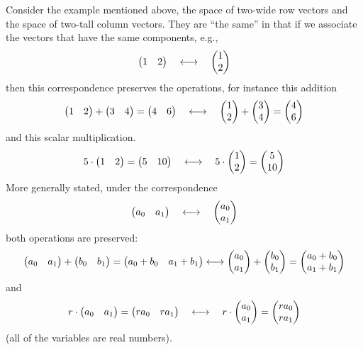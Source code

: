 \begin{example}  \label{exam:TwoWideIsoTwoTall}
Consider the example mentioned above, the 
space of two-wide row vectors and
the space of two-tall column vectors.
They are ``the same'' in that if we associate the vectors 
that have the same components, e.g.,
\begin{equation*}
   \begin{pmatrix} 1 &2 \end{pmatrix} \quad\longleftrightarrow\quad \begin{pmatrix} 1 \\ 2 \end{pmatrix}
\end{equation*}
then this correspondence preserves the operations, for instance this addition
\begin{equation*}
  \begin{pmatrix} 1 &2 \end{pmatrix}+\begin{pmatrix} 3 &4 \end{pmatrix}=\begin{pmatrix} 4 &6 \end{pmatrix}
  \quad\longleftrightarrow\quad
  \begin{pmatrix} 1 \\ 2 \end{pmatrix}+\begin{pmatrix} 3 \\ 4 \end{pmatrix}=\begin{pmatrix} 4 \\ 6 \end{pmatrix}
\end{equation*}
and this scalar multiplication.
\begin{equation*}
  5\cdot\begin{pmatrix} 1  &2 \end{pmatrix}=\begin{pmatrix} 5 &10 \end{pmatrix}
  \quad\longleftrightarrow\quad
  5\cdot\begin{pmatrix} 1 \\ 2 \end{pmatrix}=\begin{pmatrix} 5 \\ 10 \end{pmatrix}
\end{equation*}
More generally stated, under the correspondence
\begin{equation*}
  \begin{pmatrix} a_0  &a_1 \end{pmatrix}
  \quad\longleftrightarrow\quad
  \begin{pmatrix} a_0 \\ a_1 \end{pmatrix}
\end{equation*} 
both operations are preserved:
\begin{equation*}
  \rowvec{a_0  &a_1}+\rowvec{b_0  &b_1}=\rowvec{a_0+b_0 &a_1+b_1}
  \hfill\longleftrightarrow\hfill
  \colvec{a_0 \\ a_1}+\colvec{b_0  \\ b_1}=\colvec{a_0+b_0  \\ a_1+b_1}
\end{equation*}
and
\begin{equation*}
 r\cdot\begin{pmatrix} a_0 &a_1 \end{pmatrix}=\begin{pmatrix} ra_0 &ra_1 \end{pmatrix}
  \quad\longleftrightarrow\quad
 r\cdot\begin{pmatrix} a_0  \\ a_1 \end{pmatrix}=\begin{pmatrix} ra_0  \\ ra_1 \end{pmatrix}
\end{equation*}
(all of the variables are real numbers).
\end{example}

